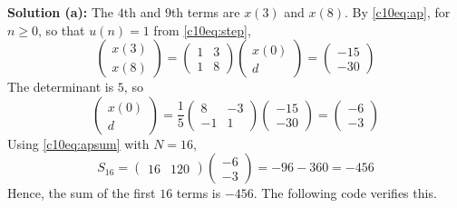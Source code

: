 \textbf{Solution (a):} The $4$th and $9$th terms are $x(3)$ and $x(8)$. By \eqref{c10eq:ap}, for $n \ge 0$, so that $u(n) = 1$ from \eqref{c10eq:step},
\begin{equation}
\begin{pmatrix} x(3) \\ x(8) \end{pmatrix} = \begin{pmatrix} 1 & 3 \\ 1 & 8 \end{pmatrix}\begin{pmatrix} x(0) \\ d \end{pmatrix} = \begin{pmatrix} -15 \\ -30 \end{pmatrix}
\end{equation}
The determinant is $5$, so
\begin{equation}
\begin{pmatrix} x(0) \\ d \end{pmatrix} = \frac{1}{5}\begin{pmatrix} 8 & -3 \\ -1 & 1 \end{pmatrix}\begin{pmatrix} -15 \\ -30 \end{pmatrix} = \begin{pmatrix} -6 \\ -3 \end{pmatrix}
\end{equation}
Using \eqref{c10eq:apsum} with $N = 16$,
\begin{equation}
S_{16} = \begin{pmatrix} 16 & 120 \end{pmatrix}\begin{pmatrix} -6 \\ -3 \end{pmatrix} = -96 - 360 = -456
\end{equation}
Hence, the sum of the first $16$ terms is $-456$. The following code verifies this.

\nopagebreak[4]
\begin{center}
\end{center}

